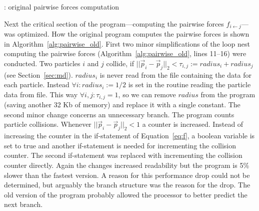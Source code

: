 \documentclass[twoside,11pt]{article}
\begin{document}
\begin{algorithm} %
  \caption{: original pairwise forces computation}
  \label{alg:pairwise_old}

  \begin{algorithmic}[1]

      \ENDFOR
    \ENDFOR

      \ENDFOR
    \ENDFOR

      \ENDFOR
    \ENDFOR

  \end{algorithmic}
\end{algorithm} %

Next the critical section of the program---computing the pairwise
forces $f_{i \leftarrow j}$---was optimized.
How the original program computes the pairwise forces is shown in
Algorithm~\ref{alg:pairwise_old}.
First two minor simplifications of the loop nest computing the
pairwise forces (Algorithm~\ref{alg:pairwise_old}, lines 11--16)
were conducted.
Two particles $i$ and $j$ collide, if $||\vec{p}_i - \vec{p}_j||_2 <
\tau_{i,j} := radius_i + radius_j$ (see Section~\ref{sec:md}).
$radius_i$ is never read from the file containing the data for each
particle.
Instead $\forall i: radius_i := 1/2$ is set in the routine reading
the particle data from file.
This way $\forall i,j: \tau_{i,j} = 1$, so we can remove $radius$ from
the program (saving another 32 Kb of memory) and replace it with a
single constant.
The second minor change concerns an unnecessary branch.
The program counts particle collisions.
Whenever $||\vec{p}_i - \vec{p}_j||_2 < 1$ a counter is increased.
Instead of increasing the counter in the if-statement of
Equation~\ref{eq:f}, a boolean variable is set to true and another
if-statement is needed for incrementing the collision counter.
The second if-statement was replaced with incrementing the collision
counter directly.
Again the changes increased readability but the program is 5\% slower
than the fastest version.
A reason for this performance drop could not be determined, but
arguably the branch structure was the reason for the drop.
The old version of the program probably allowed the processor to
better predict the next branch.
\end{document}
